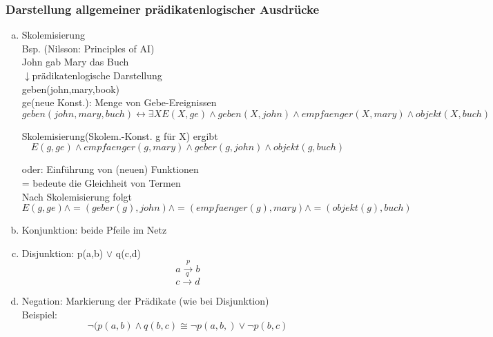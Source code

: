 \documentclass[a4paper,14pt]{article}
\begin{document}
\subsubsection{Darstellung allgemeiner prädikatenlogischer Ausdrücke}

\begin{enumerate}[(a)]
 \item Skolemisierung\\
	Bsp. (Nilsson: Principles of AI)\\
	\glqq{}John gab Mary das Buch\grqq{}\\
	$\downarrow$prädikatenlogische Darstellung\\
	geben(john,mary,book)\\
	ge(neue Konst.): Menge von Gebe-Ereignissen\\
	\begin{equation}
	 geben(john,mary,buch) \leftrightarrow \exists X E (X,ge)\wedge geben(X,john) \wedge empfaenger(X,mary) \wedge objekt(X,buch)
	\end{equation}
	
	Skolemisierung(Skolem.-Konst. g für X) ergibt\\
	\begin{equation}
	 E(g,ge)\wedge empfaenger(g,mary)\wedge geber(g,john) \wedge objekt(g,buch)
	\end{equation}

	oder: Einführung von (neuen) Funktionen\\
	\glqq = \grqq{} bedeute die Gleichheit von Termen\\
	Nach Skolemisierung folgt\\
	\begin{equation}
	 E(g,ge) \wedge =(geber(g),john) \wedge =(empfaenger(g),mary) \wedge =(objekt(g),buch)
	\end{equation}
	
\item 	Konjunktion: beide Pfeile im Netz

\item 	Disjunktion: p(a,b) $\vee$ q(c,d)
	\begin{equation}
	 a \xrightarrow{p} b
	\end{equation}
	\begin{equation}
	 c \xrightarrow{q} d
	\end{equation}
	\item Negation: Markierung der Prädikate (wie bei Disjunktion)\\
	Beispiel:
	\begin{equation}
	 \neg(p(a,b)\wedge q(b,c) \cong \neg p(a,b,) \vee \neg p(b,c)
	\end{equation}
	

\end{enumerate}
\end{document}
